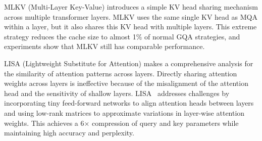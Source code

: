 MLKV (Multi-Layer Key-Value) \cite{zuhriMLKVMultiLayerKeyValue2024} introduces a simple KV head sharing mechanism across multiple transformer layers. MLKV uses the same single KV head as MQA within a layer, but it also shares this KV head with multiple layers. This extreme strategy reduces the cache size to almost 1\% of normal GQA strategies, and experiments show that MLKV still has comparable performance. 

LISA (Lightweight Substitute for Attention) \cite{muCrosslayerAttentionSharing2024} makes a comprehensive analysis for the similarity of attention patterns across layers. Directly sharing attention weights across layers is ineffective because of the misalignment of the attention head and the sensitivity of shallow layers. LISA~\cite{muCrosslayerAttentionSharing2024} addresses challenges by incorporating tiny feed-forward networks to align attention heads between layers and using low-rank matrices to approximate variations in layer-wise attention weights. This achieves a 6× compression of query and key parameters while maintaining high accuracy and perplexity.

